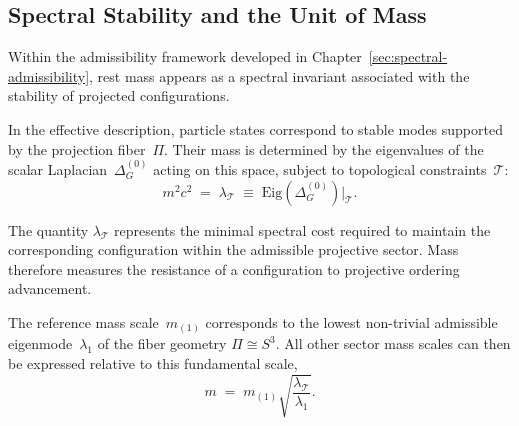 \subsection{Spectral Stability and the Unit of Mass}
  \label{sec:spectral-stability}

  Within the admissibility framework developed in Chapter~\ref{sec:spectral-admissibility},
  rest mass appears as a spectral invariant associated with
  the stability of projected configurations.

  In the effective description, particle states correspond to
  stable modes supported by the projection fiber~$\Pi$.
  Their mass is determined by the eigenvalues of the scalar
  Laplacian~$\Delta^{(0)}_G$ acting on this space, subject to
  topological constraints~$\mathcal{T}$:
  \begin{equation}
    m^2 c^2 \;=\; \lambda_{\mathcal{T}}
    \;\equiv\;
    \mathrm{Eig}\!\left(\Delta^{(0)}_G\right)
    \Big|_{\mathcal{T}} .
    \label{eq:mass_spectral_def}
  \end{equation}

  The quantity $\lambda_{\mathcal{T}}$ represents the minimal
  spectral cost required to maintain the corresponding
  configuration within the admissible projective sector.
  Mass therefore measures the resistance of a configuration
  to projective ordering advancement.

  The reference mass scale~$m_{(1)}$ corresponds to the lowest
  non-trivial admissible eigenmode~$\lambda_1$ of the fiber
  geometry $\Pi \cong S^3$.
  All other sector mass scales can then be expressed relative to
  this fundamental scale,
  \begin{equation}
    m \;=\; m_{(1)}
    \sqrt{\frac{\lambda_{\mathcal{T}}}{\lambda_1}} .
  \end{equation}

